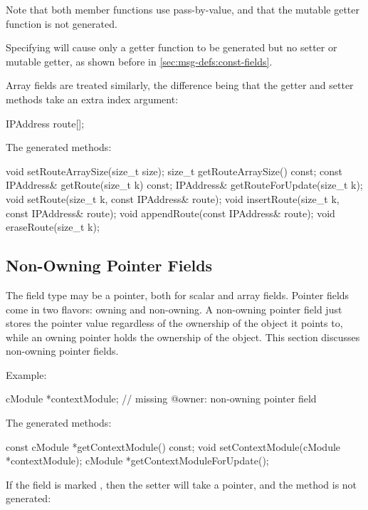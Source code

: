 Note that both member functions use pass-by-value, and that the mutable getter
function is not generated.

Specifying  will cause only a getter function to be generated
but no setter or mutable getter, as shown before in \ref{sec:msg-defs:const-fields}.

Array fields are treated similarly, the difference being that the getter and setter
methods take an extra index argument:

\begin{msg}
IPAddress route[];
\end{msg}

The generated methods:

\begin{cpp}
void setRouteArraySize(size_t size);
size_t getRouteArraySize() const;
const IPAddress& getRoute(size_t k) const;
IPAddress& getRouteForUpdate(size_t k);
void setRoute(size_t k, const IPAddress& route);
void insertRoute(size_t k, const IPAddress& route);
void appendRoute(const IPAddress& route);
void eraseRoute(size_t k);
\end{cpp}


\subsection{Non-Owning Pointer Fields}
\label{sec:msg-defs:non-owning-pointer-fields}

The field type may be a pointer, both for scalar and array fields. Pointer
fields come in two flavors: owning and non-owning. A non-owning pointer field
just stores the pointer value regardless of the ownership of the object it
points to, while an owning pointer holds the ownership of the object. This
section discusses non-owning pointer fields.

Example:

\begin{msg}
cModule *contextModule;  // missing @owner: non-owning pointer field
\end{msg}

The generated methods:

\begin{cpp}
const cModule *getContextModule() const;
void setContextModule(cModule *contextModule);
cModule *getContextModuleForUpdate();
\end{cpp}

If the field is marked , then the setter will take a
 pointer, and the  method is not generated:

